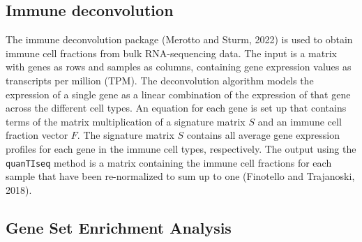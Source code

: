 \documentclass[
  parskip,
  oneside]{scrreprt}
\begin{document}
\hypertarget{immune-deconvolution}{%
\subsection{Immune deconvolution}\label{immune-deconvolution}}

The immune deconvolution package (Merotto and Sturm, 2022) is used to
obtain immune cell fractions from bulk RNA-sequencing data. The input is
a matrix with genes as rows and samples as columns, containing gene
expression values as transcripts per million (TPM). The deconvolution
algorithm models the expression of a single gene as a linear combination
of the expression of that gene across the different cell types. An
equation for each gene is set up that contains terms of the matrix
multiplication of a signature matrix \(S\) and an immune cell fraction
vector \(F\). The signature matrix \(S\) contains all average gene
expression profiles for each gene in the immune cell types,
respectively. The output using the \texttt{quanTIseq} method is a matrix
containing the immune cell fractions for each sample that have been
re-normalized to sum up to one (Finotello and Trajanoski, 2018).

\hypertarget{gene-set-enrichment-analysis}{%
\subsection{Gene Set Enrichment
Analysis}\label{gene-set-enrichment-analysis}}
\end{document}

